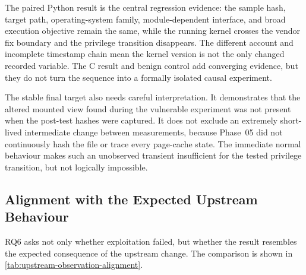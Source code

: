The paired Python result is the central regression evidence: the sample hash,
target path, operating-system family, module-dependent interface, and broad
execution objective remain the same, while the running kernel crosses the
vendor fix boundary and the privilege transition disappears. The different
account and incomplete timestamp chain mean the kernel version is not the only
changed recorded variable. The C result and benign control add converging
evidence, but they do not turn the sequence into a formally isolated causal
experiment.

The stable final target also needs careful interpretation. It demonstrates
that the altered mounted view found during the vulnerable experiment was not
present when the post-test hashes were captured. It does not exclude an
extremely short-lived intermediate change between measurements, because
Phase~05 did not continuously hash the file or trace every page-cache state.
The immediate normal  behaviour makes such an unobserved transient
insufficient for the tested privilege transition, but not logically impossible.

\subsection{Alignment with the Expected Upstream Behaviour}

RQ6 asks not only whether exploitation failed, but whether the result resembles
the expected consequence of the upstream change. The comparison is shown in
\cref{tab:upstream-observation-alignment}.

